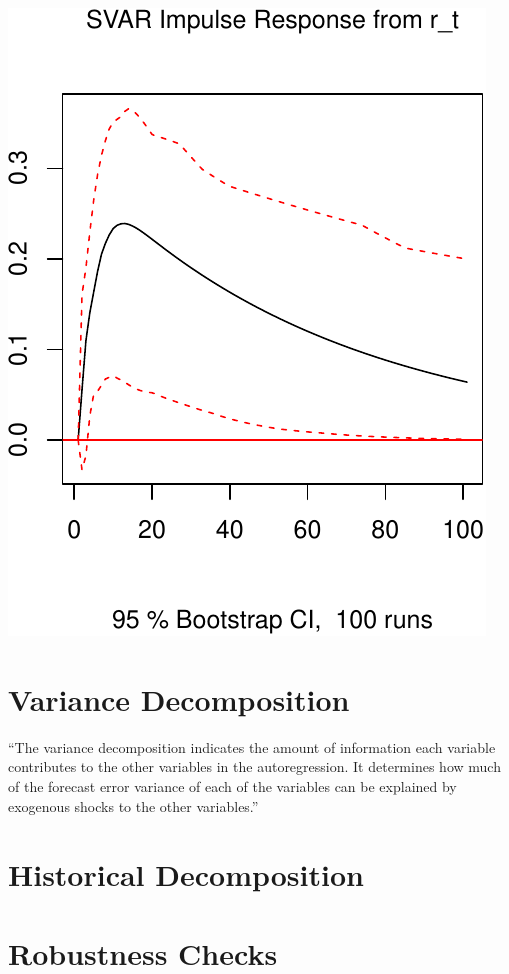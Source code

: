 \documentclass[11pt,preprint, authoryear]{elsarticle}
\numberwithin{equation}{section}
\numberwithin{figure}{section}
\numberwithin{table}{section}
\begin{document}
\includegraphics{TS_proj_files/figure-latex/unnamed-chunk-26-1.pdf}

\hypertarget{variance-decomposition}{%
\section{Variance Decomposition}\label{variance-decomposition}}

``The variance decomposition indicates the amount of information each
variable contributes to the other variables in the autoregression. It
determines how much of the forecast error variance of each of the
variables can be explained by exogenous shocks to the other variables.''

\hypertarget{historical-decomposition}{%
\section{Historical Decomposition}\label{historical-decomposition}}

\hypertarget{robustness-checks}{%
\section{Robustness Checks}\label{robustness-checks}}
\end{document}
